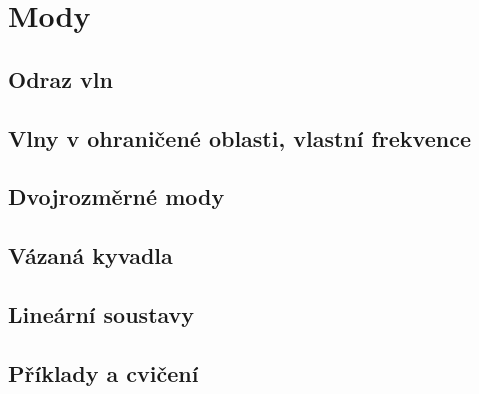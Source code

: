 \chapter{Mody}\label{fyz:IchapIL}
\minitoc
  \section{Odraz vln}\label{fyz:IchapILsecI}
  \section{Vlny v ohraničené oblasti, vlastní frekvence}\label{fyz:IchapILsecII}
  \section{Dvojrozměrné mody}\label{fyz:IchapILsecIII}
  \section{Vázaná kyvadla}\label{fyz:IchapILsecIV}
  \section{Lineární soustavy}\label{fyz:IchapILsecV}
  \section{Příklady a cvičení}\label{fyz:IchapILsecVI}